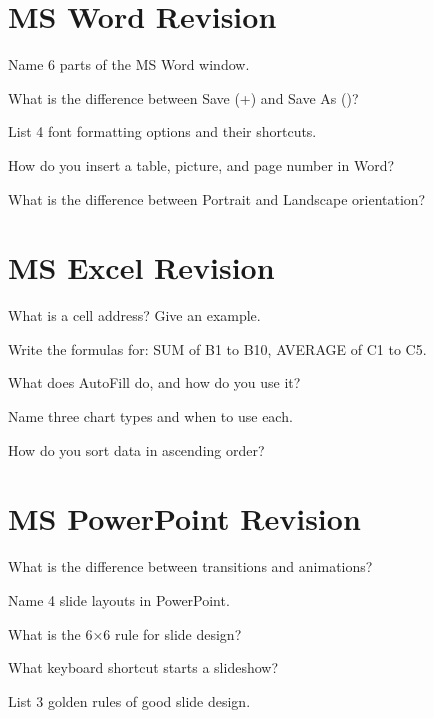 \section{MS Word Revision}
\label{sec:word-revision}

\begin{reviewqs}
  \item Name 6 parts of the MS Word window.
  \item What is the difference between Save (+) and Save As ()?
  \item List 4 font formatting options and their shortcuts.
  \item How do you insert a table, picture, and page number in Word?
  \item What is the difference between Portrait and Landscape orientation?
\end{reviewqs}

\section{MS Excel Revision}
\label{sec:excel-revision}

\begin{reviewqs}
  \item What is a cell address? Give an example.
  \item Write the formulas for: SUM of B1 to B10, AVERAGE of C1 to C5.
  \item What does AutoFill do, and how do you use it?
  \item Name three chart types and when to use each.
  \item How do you sort data in ascending order?
\end{reviewqs}

\section{MS PowerPoint Revision}
\label{sec:ppt-revision}

\begin{reviewqs}
  \item What is the difference between transitions and animations?
  \item Name 4 slide layouts in PowerPoint.
  \item What is the 6×6 rule for slide design?
  \item What keyboard shortcut starts a slideshow?
  \item List 3 golden rules of good slide design.
\end{reviewqs}

